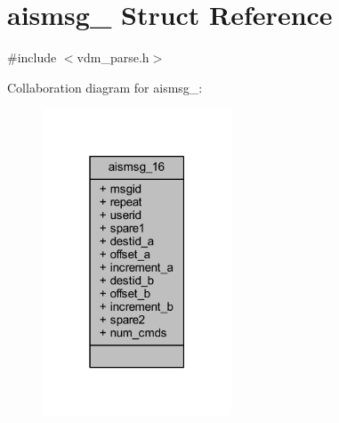 \hypertarget{structaismsg__16}{}\section{aismsg\+\_ Struct Reference}
\label{structaismsg__16}


{\ttfamily \#include $<$vdm\+\_\+parse.\+h$>$}



Collaboration diagram for aismsg\+\_\+:
\nopagebreak
\begin{figure}[H]
\begin{center}
\leavevmode
\includegraphics[width=159pt]{structaismsg__16__coll__graph}
\end{center}
\end{figure}
